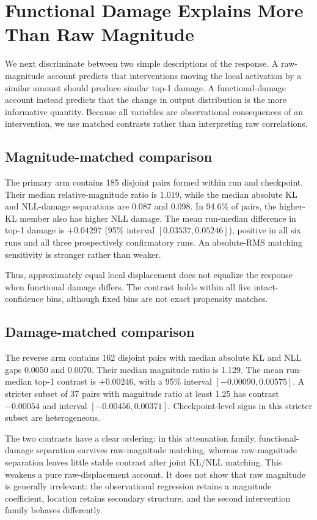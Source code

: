\section{Functional Damage Explains More Than Raw Magnitude}
\label{sec:damage}

We next discriminate between two simple descriptions of the response. A raw-
magnitude account predicts that interventions moving the local activation by a
similar amount should produce similar top-1 damage. A functional-damage account
instead predicts that the change in output distribution is the more informative
quantity. Because all variables are observational consequences of an
intervention, we use matched contrasts rather than interpreting raw
correlations.

\subsection{Magnitude-matched comparison}

The primary arm contains 185 disjoint pairs formed within run and checkpoint.
Their median relative-magnitude ratio is 1.019, while the median absolute KL and
NLL-damage separations are 0.087 and 0.098. In 94.6\% of pairs, the higher-KL
member also has higher NLL damage. The mean run-median difference in top-1
damage is $+0.04297$ (95\% interval $[0.03537,0.05246]$), positive in all six
runs and all three prospectively confirmatory runs. An absolute-RMS matching
sensitivity is stronger rather than weaker.

Thus, approximately equal local displacement does not equalize the response
when functional damage differs. The contrast holds within all five intact-
confidence bins, although fixed bins are not exact propensity matches.

\subsection{Damage-matched comparison}

The reverse arm contains 162 disjoint pairs with median absolute KL and NLL
gaps 0.0050 and 0.0070. Their median magnitude ratio is 1.129. The mean
run-median top-1 contrast is $+0.00246$, with a 95\% interval
$[-0.00090,0.00575]$. A stricter subset of 37 pairs with magnitude ratio at
least 1.25 has contrast $-0.00054$ and interval $[-0.00456,0.00371]$.
Checkpoint-level signs in this stricter subset are heterogeneous.

The two contrasts have a clear ordering: in this attenuation family,
functional-damage separation survives raw-magnitude matching, whereas
raw-magnitude separation leaves little stable contrast after joint KL/NLL
matching. This weakens a pure raw-displacement account. It does not show that
raw magnitude is generally irrelevant: the observational regression retains a
magnitude coefficient, location retains secondary structure, and the second
intervention family behaves differently.

